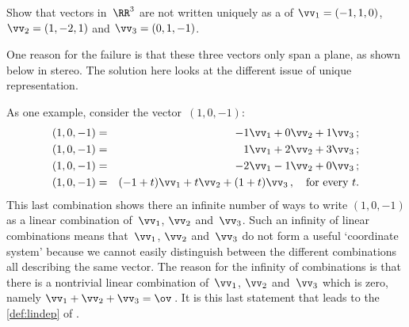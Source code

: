 \begin{example}[3D failure] \label{eg:}
Show that vectors in~\(\RR^3\) are not written uniquely as a  of \(\vv_1=(-1,1,0)\), \(\vv_2=(1,-2,1)\) and \(\vv_3=(0,1,-1)\). 

One reason for the failure is that these three vectors only span a plane, as shown below in stereo.  
The solution here looks at the different issue of unique representation.
\begin{center}
\end{center}
\begin{solution} 
As one example, consider the vector~\((1,0,-1)\):
\begin{eqnarray*}
(1,0,-1)&=&-1\vv_1+0\vv_2+1\vv_3\,;
\\(1,0,-1)&=&1\vv_1+2\vv_2+3\vv_3\,;
\\(1,0,-1)&=&-2\vv_1-1\vv_2+0\vv_3\,;
\\(1,0,-1)&=&(-1+t)\vv_1+t\vv_2+(1+t)\vv_3\,,\quad\text{for every }t.
\end{eqnarray*}
This last combination shows there an infinite number of ways to write \((1,0,-1)\) as a linear combination of~\(\vv_1\), \(\vv_2\) and~\(\vv_3\).
Such an infinity of linear combinations means that~\(\vv_1\), \(\vv_2\) and~\(\vv_3\) do not form a useful `coordinate system' because we cannot easily distinguish between the different combinations all describing the same vector.
The reason for the infinity of combinations is that there is a nontrivial linear combination of~\(\vv_1\), \(\vv_2\) and~\(\vv_3\) which is zero, namely \(\vv_1+\vv_2+\vv_3=\ov\)\,.
It is this last statement that leads to the \autoref{def:lindep} of .
\end{solution}
\end{example}






